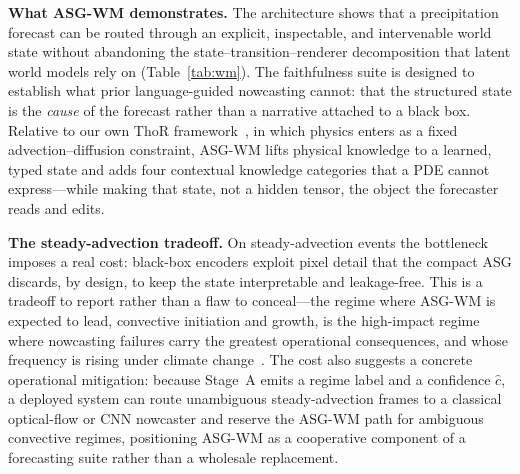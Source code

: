 \documentclass[fleqn,10pt]{wlscirep}
\begin{document}
\textbf{What ASG-WM demonstrates.}
The architecture shows that a precipitation forecast can be routed through an explicit, inspectable, and intervenable world state without abandoning the state--transition--renderer decomposition that latent world models rely on (Table~\ref{tab:wm}).
The faithfulness suite is designed to establish what prior language-guided nowcasting cannot: that the structured state is the \emph{cause} of the forecast rather than a narrative attached to a black box.
Relative to our own ThoR framework~\cite{ta2025thor}, in which physics enters as a fixed advection--diffusion constraint, ASG-WM lifts physical knowledge to a learned, typed state and adds four contextual knowledge categories that a PDE cannot express---while making that state, not a hidden tensor, the object the forecaster reads and edits.

\textbf{The steady-advection tradeoff.}
On steady-advection events the bottleneck imposes a real cost: black-box encoders exploit pixel detail that the compact ASG discards, by design, to keep the state interpretable and leakage-free.
This is a tradeoff to report rather than a flaw to conceal---the regime where ASG-WM is expected to lead, convective initiation and growth, is the high-impact regime where nowcasting failures carry the greatest operational consequences, and whose frequency is rising under climate change~\cite{ipcc2021ar6}.
The cost also suggests a concrete operational mitigation: because Stage~A emits a regime label and a confidence $\hat{c}$, a deployed system can route unambiguous steady-advection frames to a classical optical-flow or CNN nowcaster and reserve the ASG-WM path for ambiguous convective regimes, positioning ASG-WM as a cooperative component of a forecasting suite rather than a wholesale replacement.
\end{document}
